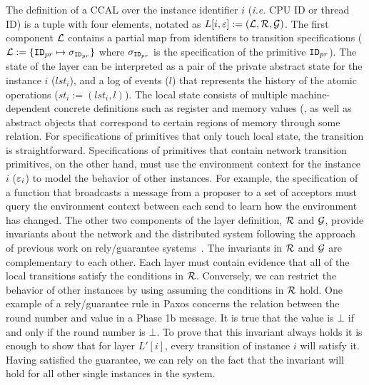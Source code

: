 {The definition of a  CCAL over the instance identifier $i$ (\textit{i.e.} CPU ID or thread ID)
is a tuple with four elements, notated as $L[i,{\varepsilon}] := (\mathcal{L}, \mathcal{R}, \mathcal{G})$.
The first component $\mathcal{L}$ contains a partial map from
identifiers to transition specifications
($\mathcal{L} := \{{{\mathrm{\texttt{ID}}}_{pr}} \mapsto \sigma_{{{\mathrm{\texttt{ID}}}_{pr}}}\}$ where $ \sigma_{{{\mathrm{\texttt{ID}}}_{pr}}}$ is
the specification of the primitive ${{\mathrm{\texttt{ID}}}_{pr}}$).
The state of the layer can be interpreted as a pair
of the private abstract state for the instance $i$ ($lst_i$), and
a log of events ($l$) that represents the history of the atomic operations ($st_i := (lst_i, l)$).
The local state consists of multiple machine-dependent concrete definitions such as register and memory values (,
as well as abstract objects that correspond to
certain regions of memory through some relation.
For specifications of primitives that only touch local state, the transition is straightforward.
Specifications of primitives that contain network transition primitives, on the other hand,
must use the environment context for the instance $i$ (${\varepsilon}_i$)
to model the behavior of other instances.
For example, the specification of a function that broadcasts a message from a proposer to a set of acceptors must query the environment context
between each send to learn how the environment has changed.
The other two components of the layer definition, $\mathcal{R}$ and $\mathcal{G}$,
provide invariants about the network and the distributed system
following the approach of previous work on rely/guarantee systems~\cite{RGSim, LRG}.
The invariants in $\mathcal{R}$ and $\mathcal{G}$ are complementary to each other.
Each layer must contain evidence that all of the local transitions satisfy the conditions in $\mathcal{R}$.
Conversely, we can restrict the behavior of other instances by using assuming the conditions in $\mathcal{R}$ hold.
One example of a rely/guarantee rule in Paxos concerns the relation between the round number and value in a Phase 1b message.
It is true that the value is $\bot$ if and only if the round number is $\bot$.
To prove that this invariant always holds it is enough to show that
for layer $L'[i]$, every transition of instance $i$ will satisfy it.
Having satisfied the guarantee, we can rely on the fact that the invariant will hold for all other single instances in the system.



}
